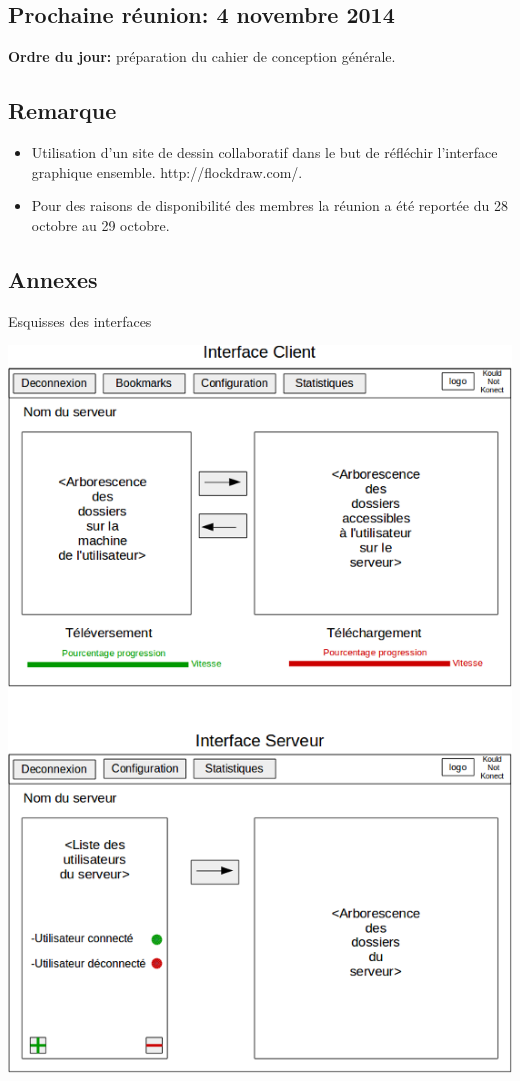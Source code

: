 \documentclass{article}
\begin{document}
\subsection*{Prochaine réunion: 4 novembre 2014}
	\textbf{Ordre du jour:} préparation du cahier de conception générale.
	
\subsection*{Remarque}
\begin{itemize}
\item Utilisation d'un site de dessin collaboratif dans le but de réfléchir l'interface graphique ensemble. http://flockdraw.com/.
\item Pour des raisons de disponibilité des membres la réunion a été reportée du 28 octobre au 29 octobre.
\end{itemize}

\newpage

\subsection*{Annexes}
Esquisses des interfaces\\
\begin{center}
	\includegraphics{Interface_projet_gl.png}
\end{center}
\end{document}
